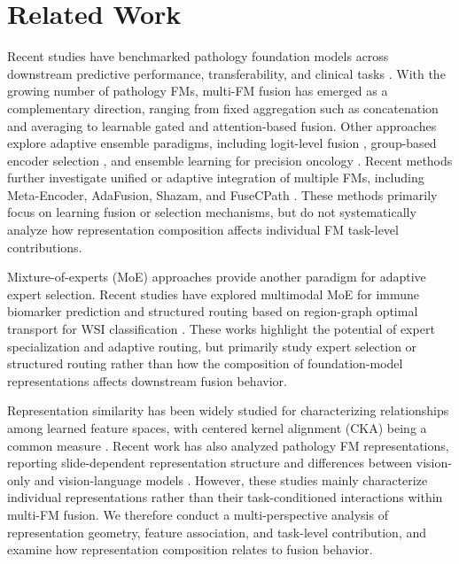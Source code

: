 \section{Related Work}
Recent studies have benchmarked pathology foundation models across downstream predictive performance, transferability, and clinical tasks \citep{lei2026validation, boutaj2026from, vanderbilt2026goldmark}. With the growing number of pathology FMs, multi-FM fusion has emerged as a complementary direction, ranging from fixed aggregation such as concatenation and averaging to learnable gated and attention-based fusion. Other approaches explore adaptive ensemble paradigms, including logit-level fusion \citep{huang2026plugandplay}, group-based encoder selection \citep{quan2025gas}, and ensemble learning for precision oncology \citep{luo2025elf}. Recent methods further investigate unified or adaptive integration of multiple FMs, including Meta-Encoder, AdaFusion, Shazam, and FuseCPath \citep{gao2026metaencoder, xiao2025adafusion, lei2026shazam, yang2025fusecpath}. These methods primarily focus on learning fusion or selection mechanisms, but do not systematically analyze how representation composition affects individual FM task-level contributions.

Mixture-of-experts (MoE) approaches provide another paradigm for adaptive expert selection. Recent studies have explored multimodal MoE for immune biomarker prediction and structured routing based on region-graph optimal transport for WSI classification \citep{liu2026predicting,tian2026regiongraph}. These works highlight the potential of expert specialization and adaptive routing, but primarily study expert selection or structured routing rather than how the composition of foundation-model representations affects downstream fusion behavior.

Representation similarity has been widely studied for characterizing relationships among learned feature spaces, with centered kernel alignment (CKA) being a common measure \citep{cka}. Recent work has also analyzed pathology FM representations, reporting slide-dependent representation structure and differences between vision-only and vision-language models \citep{mishra2025comparing}. However, these studies mainly characterize individual representations rather than their task-conditioned interactions within multi-FM fusion. We therefore conduct a multi-perspective analysis of representation geometry, feature association, and task-level contribution, and examine how representation composition relates to fusion behavior.